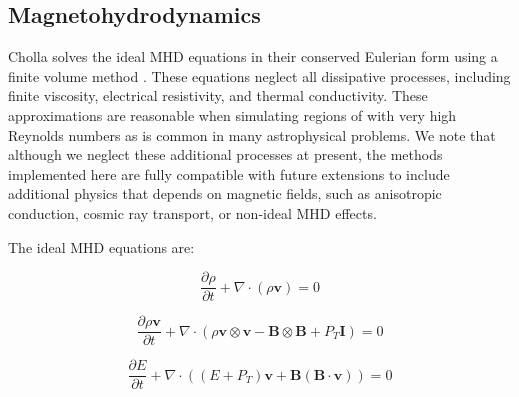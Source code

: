 \documentclass[modern]{aastex631}
\begin{document}

\subsection{Magnetohydrodynamics}
\label{sec:methods-mhd}

Cholla solves the ideal MHD equations in their conserved Eulerian form using a finite volume method \citep{Godunov}. These equations neglect all dissipative processes, including finite viscosity, electrical resistivity, and thermal conductivity. These approximations are reasonable when simulating regions of with very high Reynolds numbers as is common in many astrophysical problems. We note that although we neglect these additional processes at present, the methods implemented here are fully compatible with future extensions to include additional physics that depends on magnetic fields, such as anisotropic conduction, cosmic ray transport, or non-ideal MHD effects.

The ideal MHD equations are:

\begin{equation}
    \label{eqn:mass-conservation}
    \frac{\partial \rho}{\partial t} + \nabla \cdot (\rho \boldsymbol{v}) = 0
\end{equation}

\begin{equation}
    \label{eqn:momentum-conservation}
    \frac{\partial \rho\boldsymbol{v}}{\partial t} + \nabla \cdot (\rho \boldsymbol{v}\otimes\boldsymbol{v} - \boldsymbol{B}\otimes\boldsymbol{B} + P_T\boldsymbol{I}) = 0
\end{equation}

\begin{equation}
    \label{eqn:energy-conservation}
    \frac{\partial E}{\partial t} + \nabla \cdot ( (E + P_T) \boldsymbol{v} + \boldsymbol{B}(\boldsymbol{B}\cdot\boldsymbol{v}) ) = 0
\end{equation}
\end{document}
